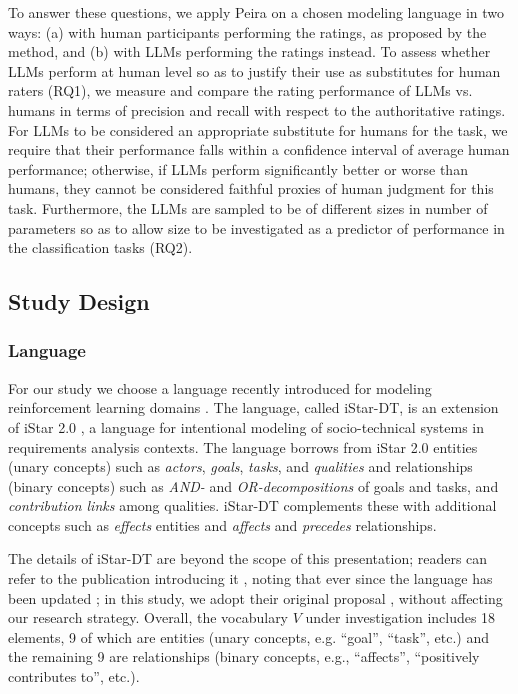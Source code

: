 To answer these questions, we apply Peira on a chosen modeling language in two ways: (a) with human participants performing the ratings, as proposed by the method, and (b) with LLMs performing the ratings instead. To assess whether LLMs perform at human level so as to justify their use as substitutes for human raters (RQ1), we measure and compare the rating performance of LLMs vs. humans in terms of precision and recall with respect to the authoritative ratings. For LLMs to be considered an appropriate substitute for humans for the task, we require that their performance falls within a confidence interval of average human performance; otherwise, if LLMs perform significantly better or worse than humans, they cannot be considered faithful proxies of human judgment for this task. Furthermore, the LLMs are sampled to be of different sizes in number of parameters so as to allow size to be investigated as a predictor of performance in the classification tasks (RQ2).

\subsection{Study Design}

\subsubsection{Language}

For our study we choose a language recently introduced for modeling reinforcement learning domains \cite{LKMG.24}. The language, called iStar-DT, is an extension of iStar 2.0 \cite{DaFH.16}, a language for intentional modeling of socio-technical systems in requirements analysis contexts. The language borrows from iStar 2.0 entities (unary concepts) such as \textit{actors}, \textit{goals}, \textit{tasks}, and \textit{qualities} and relationships (binary concepts) such as  \textit{AND-} and \textit{OR-decompositions} of goals and tasks, and  \textit{contribution links} among qualities. iStar-DT complements these with additional concepts such as \textit{effects} entities and \textit{affects} and \textit{precedes} relationships.

The details of iStar-DT are beyond the scope of this presentation; readers can refer to the publication introducing it \cite{LKMG.24}, noting that ever since the language has been updated \cite{LDKM+26}; 
in this study, we adopt their original proposal \cite{LKMG.24}, without affecting our research strategy. Overall, the vocabulary $V$ under investigation includes 18 elements, 9 of which are entities (unary concepts, e.g. ``goal'', ``task'', etc.) and the remaining 9 are relationships (binary concepts, e.g., ``affects'', ``positively contributes to'', etc.). 

